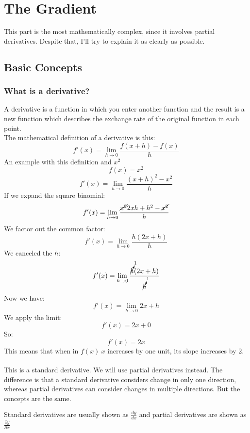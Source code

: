 \documentclass[12pt,a4paper]{article}
\begin{document}
		\section{The Gradient}
			\begin{WARNING}
				This part is the most mathematically complex, since it involves partial derivatives. Despite that, I'll try to explain it as clearly as possible.
			\end{WARNING}
			\subsection{Basic Concepts}
				\subsubsection{What is a derivative?}
					A derivative is a function in which you enter another function and the result is a new function which describes the exchange rate of the original function in each point.\\
					The mathematical definition of a derivative is this:
					$$f'(x) = \lim\limits_{h\to0}\frac{f(x+h)-f(x)}{h}$$
					An example with this definition and $x^2$
					$$f(x)=x^2$$
					$$f'(x) = \lim\limits_{h\to0}\frac{(x+h)^2-x^2}{h}$$
					If we expand the square binomial:
					$$f'(x) = \lim\limits_{h\to0}\frac{\cancel{x^2}2xh+h^2-\cancel{x^2}}{h}$$
					We factor out the common factor:
					$$f'(x) = \lim\limits_{h\to0}\frac{h(2x+h)}{h}$$
					We canceled the $h$:
					$$f'(x) = \lim\limits_{h\to0}\frac{\cancelto{1}{h}(2x+h)}{\cancelto{1}{h}}$$
					Now we have:
					$$f'(x) = \lim\limits_{h\to0}2x+h$$
					We apply the limit:
					$$f'(x) = 2x+0$$
					So:
					$$f'(x) = 2x$$
					This means that when in $f(x)\ x$ increases by one unit, its slope increases by 2.\\
					\\
					This is a standard derivative. We will use partial derivatives instead. The difference is that a standard derivative considers change in only one direction, whereas partial derivatives can consider changes in multiple directions. But the concepts are the same.
					\begin{NOTE}
						Standard derivatives are usually shown as $\frac{dy}{dx}$ and partial derivatives are shown as $\frac{\partial y}{\partial x}$
					\end{NOTE}
\end{document}
